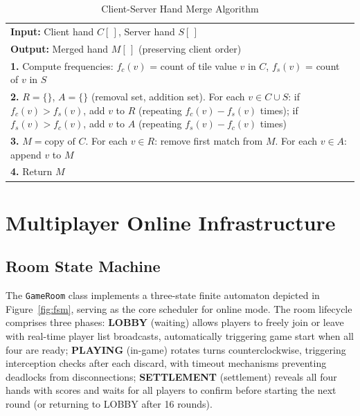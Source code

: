 \documentclass[11pt,a4paper]{article}
\begin{document}
\begin{table}[H]
\centering
\caption{Client-Server Hand Merge Algorithm}
\label{tab:algo_merge}
\small
\begin{tabular}{@{}p{}@{}}
\toprule
\textbf{Input:} Client hand $C[\,]$, Server hand $S[\,]$ \\
\textbf{Output:} Merged hand $M[\,]$ (preserving client order) \\
\midrule
\textbf{1.} Compute frequencies: $f_c(v)$ = count of tile value $v$ in $C$, $f_s(v)$ = count of $v$ in $S$ \\
\textbf{2.} $R = \{\}$, $A = \{\}$ (removal set, addition set). For each $v \in C \cup S$: if $f_c(v) > f_s(v)$, add $v$ to $R$ (repeating $f_c(v)-f_s(v)$ times); if $f_s(v) > f_c(v)$, add $v$ to $A$ (repeating $f_s(v)-f_c(v)$ times) \\
\textbf{3.} $M = \text{copy of } C$. For each $v \in R$: remove first match from $M$. For each $v \in A$: append $v$ to $M$ \\
\textbf{4.} Return $M$ \\
\bottomrule
\end{tabular}
\end{table}

\newpage
\section{Multiplayer Online Infrastructure}

\subsection{Room State Machine}

The \texttt{GameRoom} class implements a three-state finite automaton depicted in Figure~\ref{fig:fsm}, serving as the core scheduler for online mode. The room lifecycle comprises three phases: \textbf{LOBBY} (waiting) allows players to freely join or leave with real-time player list broadcasts, automatically triggering game start when all four are ready; \textbf{PLAYING} (in-game) rotates turns counterclockwise, triggering interception checks after each discard, with timeout mechanisms preventing deadlocks from disconnections; \textbf{SETTLEMENT} (settlement) reveals all four hands with scores and waits for all players to confirm before starting the next round (or returning to LOBBY after 16 rounds).
\end{document}
